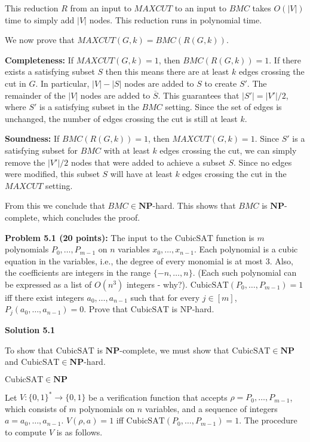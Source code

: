 \documentclass[11pt]{article}
\begin{document}
This reduction $R$ from an input to $MAXCUT$ to an input to $BMC$ takes $O(|V|)$ time to simply add $|V|$ nodes. This reduction runs in polynomial time.

We now prove that $MAXCUT(G, k) = BMC(R(G, k))$.

\textbf{Completeness:} If $MAXCUT(G, k) = 1$, then $BMC(R(G, k)) = 1$. If there exists a satisfying subset $S$ then this means there are at least $k$ edges crossing the cut in $G$. In particular, $|V| - |S|$ nodes are added to $S$ to create $S'$. The remainder of the $|V|$ nodes are added to $\overline{S}$. This guarantees that $|S'| = |V'| / 2$, where $S'$ is a satisfying subset in the $BMC$ setting. Since the set of edges is unchanged, the number of edges crossing the cut is still at least $k$.

\textbf{Soundness:} If $BMC(R(G, k)) = 1$, then $MAXCUT(G, k) = 1$. Since $S'$ is a satisfying subset for $BMC$ with at least $k$ edges crossing the cut, we can simply remove the $|V'|/2$ nodes that were added to achieve a subset $S$. Since no edges were modified, this subset $S$ will have at least $k$ edges crossing the cut in the $MAXCUT$ setting.

From this we conclude that $BMC \in \mathbf{NP}$-hard. This shows that $BMC$ is \(\mathbf{NP}\)-complete, which concludes the proof.

\newpage

\newcommand{\CSAT}{\mathrm{CubicSAT}}

\textbf{Problem 5.1 (20 points):} The input to the $\CSAT$ function is $m$ polynomials $P_0,\ldots,P_{m-1}$ on $n$ variables $x_0,\ldots,x_{n-1}$. Each polynomial is a cubic equation in the variables, i.e., the degree of every monomial is at most $3$. Also, the coefficients are integers in the range $\{-n,\ldots,n\}$. (Each such polynomial can be expressed as a list of $O(n^3)$ integers - why?). $\CSAT(P_0,\ldots,P_{m-1}) = 1$ iff there exist integers $a_0,\ldots,a_{n-1}$ such that for every $j \in [m]$, $P_j(a_0,\ldots,a_{n-1})=0$. Prove that $\CSAT$ is NP-hard.

\textbf{Solution 5.1}

To show that $\CSAT$ is \(\mathbf{NP}\)-complete, we must show that $\CSAT \in \mathbf{NP}$ and $\CSAT \in \mathbf{NP}$-hard.

$\CSAT \in \mathbf{NP}$

Let $V: \{0, 1\}^* \to \{0, 1\}$ be a verification function that accepts $\rho = P_0,\ldots,P_{m-1}$, which consists of $m$ polynomials on $n$ variables, and a sequence of integers $a = a_0,\ldots,a_{n-1}$. $V(\rho, a) = 1$ iff $\CSAT(P_0,\ldots,P_{m-1}) = 1$. The procedure to compute $V$ is as follows.
\end{document}
